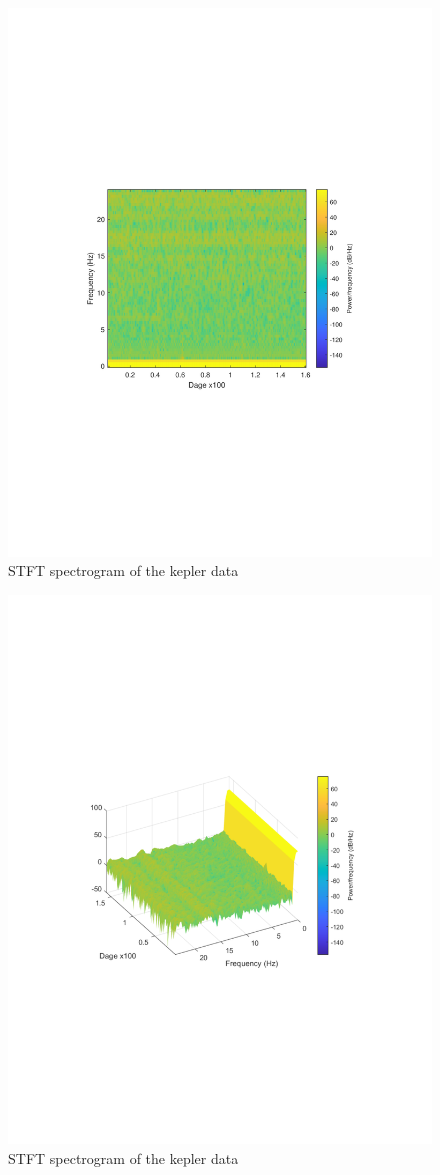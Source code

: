 \begin{figure}[h]
  \centering
  \includegraphics[width=\textwidth]{matlabstuff/STFT.pdf}
  \caption{STFT spectrogram of the kepler data}%
  \label{fig:STFT}
\end{figure}

\begin{figure}[h]
  \centering
  \includegraphics[width=\textwidth]{matlabstuff/mesh_stft.pdf}
  \caption{STFT spectrogram of the kepler data}%
  \label{fig:STFT}
\end{figure}

